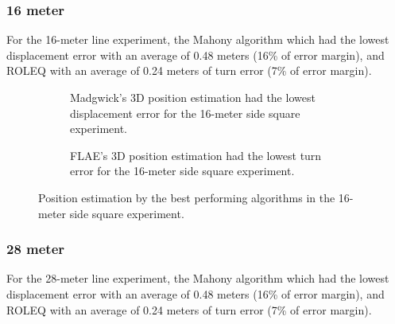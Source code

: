 \subsubsection{16 meter}

For the 16-meter line experiment, the Mahony algorithm which had the lowest displacement error with an average of 0.48 meters (16\% of error margin), and ROLEQ with an average of 0.24 meters of turn error (7\% of error margin).

\begin{figure}[!h]
    \centering
    
\end{figure}

\begin{figure}[!h]
    \centering
    \begin{subfigure}{0.49\textwidth}
        \centering
        \resizebox{1\linewidth}{!}{}
        \caption{Madgwick's 3D position estimation had the lowest displacement error for the 16-meter side square experiment.}
        \label{fig:square162D}
    \end{subfigure}
    \begin{subfigure}{0.49\textwidth}
        \centering
        \resizebox{1\linewidth}{!}{}
        \caption{FLAE's 3D position estimation had the lowest turn error for the 16-meter  side square experiment.}
        \label{fig:square163D}
    \end{subfigure}
    \caption{Position estimation by the best performing algorithms in the 16-meter side square experiment.}
    \label{fig:square16}
\end{figure}

\subsubsection{28 meter}

For the 28-meter line experiment, the Mahony algorithm which had the lowest displacement error with an average of 0.48 meters (16\% of error margin), and ROLEQ with an average of 0.24 meters of turn error (7\% of error margin).

\begin{figure}[!h]
    \centering
    
\end{figure}


